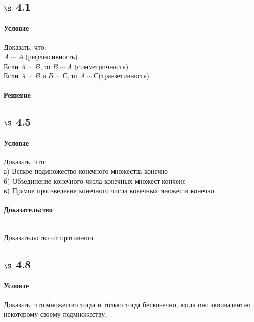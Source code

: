 \documentclass[a4paper,12pt]{article}
\begin{document}
\subsection*{$\S$ 4.1}
\paragraph*{Условие}
Доказать, что:\\
$ A \backsim A $ (рефлексивность)\\
Если $ A \backsim B $, то $ B \backsim A $ (симметричность)\\
Если $ A \backsim B $ и $ B \backsim С $, то $ A \backsim С $(транзетивность)
\paragraph*{Решение}

\subsection*{$\S$ 4.5}
\paragraph*{Условие}
Доказать, что:\\
а) Всякое подмножество конечного множества конечно\\
б) Объединение конечного числа конечных множест кончено\\
в) Прямое произведение конечного числа конечных множеств конечно
\paragraph*{Доказательство}\mbox{}\\
Доказательство от противного

\subsection*{$\S$ 4.8}
\paragraph*{Условие}
Доказать, что множество тогда и только тогда бесконечно, когда оно эквивалентно некоторому своему подмножеству.
\end{document}
